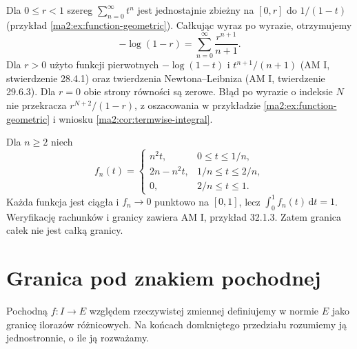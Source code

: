\begin{przyklad}
\label{ma2:ex:termwise-geometric-integral}
Dla $0\le r<1$ szereg $\sum_{n=0}^\infty t^n$
jest jednostajnie zbieżny na $[0,r]$ do $1/(1-t)$
(przykład \ref{ma2:ex:function-geometric}).
Całkując wyraz po wyrazie, otrzymujemy
\[
 -\log(1-r)=\sum_{n=0}^\infty\frac{r^{n+1}}{n+1}.
\]
Dla $r>0$ użyto funkcji pierwotnych
$-\log(1-t)$ i $t^{n+1}/(n+1)$
(AM I, stwierdzenie 28.4.1)
oraz twierdzenia Newtona--Leibniza
(AM I, twierdzenie 29.6.3).
Dla $r=0$ obie strony równości są zerowe. Błąd po wyrazie
o indeksie $N$ nie przekracza
$r^{N+2}/(1-r)$, z oszacowania w przykładzie
\ref{ma2:ex:function-geometric} i wniosku
\ref{ma2:cor:termwise-integral}.
\end{przyklad}

\begin{przyklad}
\label{ma1:ex:parameter-moving-spike}
Dla $n\ge2$ niech
\[
 f_n(t)=\begin{cases}
 n^2t,&0\le t\le1/n,\\
 2n-n^2t,&1/n\le t\le2/n,\\
 0,&2/n\le t\le1.
 \end{cases}
\]
Każda funkcja jest ciągła i $f_n\to0$ punktowo
na $[0,1]$, lecz $\int_0^1 f_n(t)\,\mathrm dt=1$.
Weryfikację rachunków i granicy zawiera AM I,
przykład 32.1.3. Zatem granica całek
nie jest całką granicy.
\end{przyklad}

\section{Granica pod znakiem pochodnej}

Pochodną $f:I\to E$ względem rzeczywistej
zmiennej definiujemy w normie $E$ jako granicę
ilorazów różnicowych. Na końcach domkniętego
przedziału rozumiemy ją jednostronnie,
o ile ją rozważamy.


